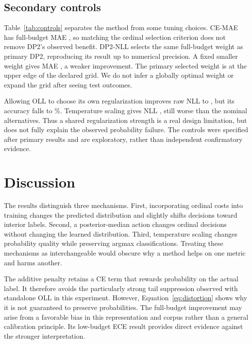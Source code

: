 \documentclass[10pt,twocolumn]{article}
\begin{document}
\subsection{Secondary controls}
Table~\ref{tab:controls} separates the method from some tuning choices. CE-MAE has full-budget MAE \FullCEMAEMAE{}, so matching the ordinal selection criterion does not remove DP2's observed benefit. DP2-NLL selects the same full-budget weight as primary DP2, reproducing its result up to numerical precision. A fixed smaller weight gives MAE \FullDPfixedMAE{}, a weaker improvement. The primary selected weight is at the upper edge of the declared grid. We do not infer a globally optimal weight or expand the grid after seeing test outcomes.

Allowing OLL to choose its own regularization improves raw NLL to \FullOLLregNLL{}, but its accuracy falls to \FullOLLregAcc\%. Temperature scaling gives NLL \FullOLLregTSNLL{}, still worse than the nominal alternatives. Thus a shared regularization strength is a real design limitation, but does not fully explain the observed probability failure. The controls were specified after primary results and are exploratory, rather than independent confirmatory evidence.

\begin{table}[t]
\centering\small
\setlength{\tabcolsep}{5pt}

\caption{Secondary full-budget controls on the original saved splits. CE-MAE changes CE selection to MAE; DP2-NLL changes penalty selection to NLL; DP2-fixed uses $\lambda=0.5$; OLL-reg tunes its own regularization. These controls address confounds without replacing the primary protocol.}
\label{tab:controls}
\end{table}

\section{Discussion}
The results distinguish three mechanisms. First, incorporating ordinal costs into training changes the predicted distribution and slightly shifts decisions toward interior labels. Second, a posterior-median action changes ordinal decisions without changing the learned distribution. Third, temperature scaling changes probability quality while preserving argmax classifications. Treating these mechanisms as interchangeable would obscure why a method helps on one metric and harms another.

The additive penalty retains a CE term that rewards probability on the actual label. It therefore avoids the particularly strong tail suppression observed with standalone OLL in this experiment. However, Equation~\ref{eq:distortion} shows why it is not guaranteed to preserve probabilities. The full-budget improvement may arise from a favorable bias in this representation and corpus rather than a general calibration principle. Its low-budget ECE result provides direct evidence against the stronger interpretation.
\end{document}
